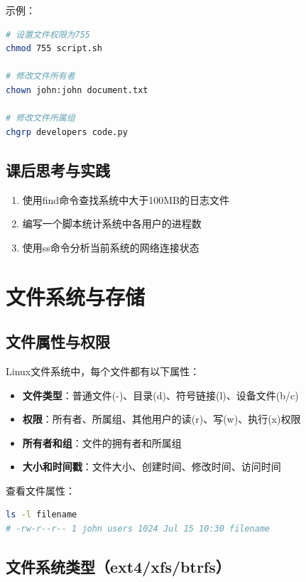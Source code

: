 \documentclass[12pt,UTF8]{ctexbook}
\begin{document}
示例：
\begin{lstlisting}[language=bash]
# 设置文件权限为755
chmod 755 script.sh

# 修改文件所有者
chown john:john document.txt

# 修改文件所属组
chgrp developers code.py
\end{lstlisting}

\section{课后思考与实践}
\label{sec:commands-practice}
\begin{enumerate}
    \item 使用find命令查找系统中大于100MB的日志文件
    \item 编写一个脚本统计系统中各用户的进程数
    \item 使用ss命令分析当前系统的网络连接状态
\end{enumerate}

\chapter{文件系统与存储}
\label{chap:filesystem-storage}

\section{文件属性与权限}
\label{sec:file-attributes}

Linux文件系统中，每个文件都有以下属性：

\begin{itemize}
    \item \textbf{文件类型}：普通文件(-)、目录(d)、符号链接(l)、设备文件(b/c)
    \item \textbf{权限}：所有者、所属组、其他用户的读(r)、写(w)、执行(x)权限
    \item \textbf{所有者和组}：文件的拥有者和所属组
    \item \textbf{大小和时间戳}：文件大小、创建时间、修改时间、访问时间
\end{itemize}

查看文件属性：
\begin{lstlisting}[language=bash]
ls -l filename
# -rw-r--r-- 1 john users 1024 Jul 15 10:30 filename
\end{lstlisting}

\section{文件系统类型（ext4/xfs/btrfs）}
\label{sec:fs-types}
\end{document}
